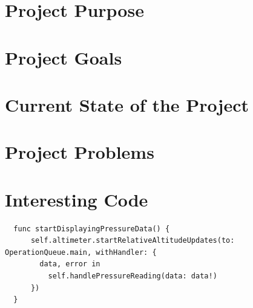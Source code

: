 \documentclass[onecolumn, draftclsnofoot,10pt, compsoc]{IEEEtran}
\def \CapstoneProjectName{ISS Barometer App }
\begin{document}
\begin{titlepage}
\begin{singlespace}
{{            }
            \vspace{20pt}
        }
        \begin{abstract}
        The International Space Station, the conglomerate work of multiple national space associations, including NASA, requires precision devices to monitor the many aspects of space life.
        One very important aspect for the success of life in near vacuum is sustained air pressure inside the modules.
        This air pressure is monitored by mechanical barometers, called Manovacometers, which must be visually monitored, and are no longer available.
        The \CapstoneProjectName seeks to provide a suitable replacement for the current barometer device aboard the International Space Station.
        This document will serve to introduce the \CapstoneProjectName, and will detail the problem, the solution, and the success metrics of the project.
        The sections include the Definition of the Problem, Definition of Project, and the Metrics of Success.
        \end{abstract}
    \end{singlespace}
\end{titlepage}
\newpage
{}
\tableofcontents
\clearpage

\section{Project Purpose}

\section{Project Goals}

\section{Current State of the Project}

\section{Project Problems}

\section{Interesting Code}
\begin{lstlisting}
  func startDisplayingPressureData() {
      self.altimeter.startRelativeAltitudeUpdates(to: OperationQueue.main, withHandler: {
        data, error in
          self.handlePressureReading(data: data!)
      })
  }

\end{lstlisting}
\end{document}

